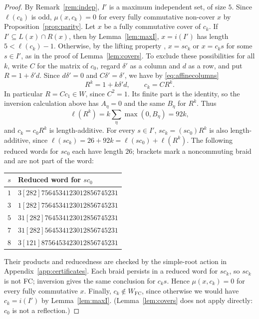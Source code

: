 \documentclass[10pt]{article}
\theoremstyle{remark}
\newcommand{\FC}{W_{\mathrm{FC}}}
\begin{document}
\begin{proof}
By Remark~\ref{rem:indep}, $I'$ is a maximum independent set, of size
$5$. Since $\ell(c_k)$ is odd,
$\mu(x,c_k)=0$ for every fully commutative non-cover $x$ by
Proposition~\ref{prop:parity}. Let $x$ be a
fully commutative cover of $c_k$. If $I'\subseteq L(x)\cap R(x)$, then
by Lemma~\ref{lem:maxI}, $x=i(I')$ has length $5<\ell(c_k)-1$.
Otherwise, by the lifting property \cite[Proposition~2.2.7]{BB}, $x=sc_k$
or $x=c_ks$ for some $s\in I'$, as in the proof of
Lemma~\ref{lem:covers}. To exclude these possibilities for all $k$, write $C$ for the matrix of
$c_0$, regard $\delta'$ as a column and $d$ as a row, and put
$R=1+\delta'd$. Since $d\delta'=0$ and $C\delta'=\delta'$, we have
by \eqref{eq:affinecolumns}
\[
 R^k=1+k\delta'd,\qquad c_k=CR^k.
\]
In particular $R=Cc_1\in W$, since $C^2=1$. Its finite part is the
identity, so the inversion calculation above has $A_\eta=0$ and the same
$B_\eta$ for $R^k$. Thus
\[
 \ell(R^k)=k\sum_\eta\max(0,B_\eta)=92k,
\]
and $c_k=c_0R^k$ is length-additive. For every $s\in I'$,
$sc_k=(sc_0)R^k$ is also length-additive, since
$\ell(sc_k)=26+92k=\ell(sc_0)+\ell(R^k)$.
The following reduced words for $sc_0$ each have length $26$; brackets
mark a noncommuting braid and are not part of the word:
\begin{center}\small
\begin{tabular}{@{}cl@{}}
\toprule
$s$ & Reduced word for $sc_0$\\
\midrule
$1$ & $3[282]7564534123012856745231$\\
$3$ & $1[282]7564534123012856745231$\\
$5$ & $31[282]764534123012856745231$\\
$7$ & $31[282]564534123012856745231$\\
$8$ & $3[121]8756453423012856745231$\\
\bottomrule
\end{tabular}
\end{center}
Their products and reducedness are checked by the simple-root action in
Appendix~\ref{app:certificates}. Each braid persists in a reduced word for
$sc_k$, so $sc_k$ is not FC; inversion gives the same conclusion for
$c_ks$. Hence $\mu(x,c_k)=0$ for every fully
commutative $x$. Finally, $c_k\notin\FC$, since otherwise
we would have $c_k=i(I')$ by Lemma~\ref{lem:maxI}. (Lemma~\ref{lem:covers}
does not apply directly: $c_0$ is not a reflection.)
\end{proof}
\end{document}
